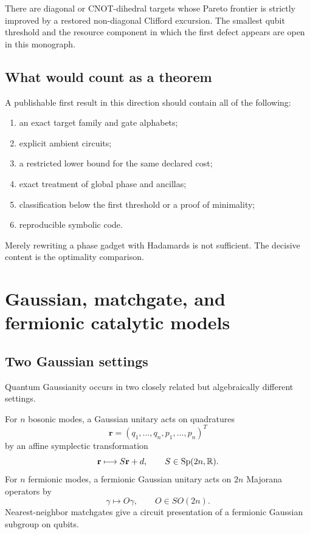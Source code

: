 \begin{conjecturebox}
There are diagonal or CNOT-dihedral targets whose Pareto frontier is strictly improved by a restored non-diagonal Clifford excursion.  The smallest qubit threshold and the resource component in which the first defect appears are open in this monograph.
\end{conjecturebox}

\subsection{What would count as a theorem}
A publishable first result in this direction should contain all of the following:
\begin{enumerate}
\item an exact target family and gate alphabets;
\item explicit ambient circuits;
\item a restricted lower bound for the same declared cost;
\item exact treatment of global phase and ancillas;
\item classification below the first threshold or a proof of minimality;
\item reproducible symbolic code.
\end{enumerate}
Merely rewriting a phase gadget with Hadamards is not sufficient.  The decisive content is the optimality comparison.

\section{Gaussian, matchgate, and fermionic catalytic models}\label{g:ch:gaussian}


\subsection{Two Gaussian settings}
Quantum Gaussianity occurs \cite{g:WeedbrookEtAl2012} in two closely related but algebraically different settings.

For $n$ bosonic modes, a Gaussian unitary acts on quadratures
\[
\mathbf r=(q_1,\ldots,q_n,p_1,\ldots,p_n)^T
\]
by an affine symplectic transformation
\[
\mathbf r\longmapsto S\mathbf r+d,
\qquad
S\in\operatorname{Sp}(2n,\mathbb R).
\]
For $n$ fermionic modes, a fermionic Gaussian unitary acts on $2n$ Majorana operators by
\[
\gamma\longmapsto O\gamma,
\qquad O\in SO(2n).
\]
Nearest-neighbor matchgates give a circuit presentation of a fermionic Gaussian subgroup on qubits.

